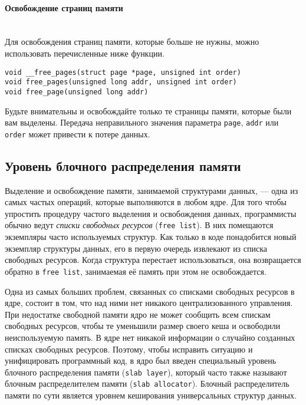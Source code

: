 \documentclass[12pt]{article}
\begin{document}
\paragraph*{Освобождение страниц памяти} ~\\
Для освобождения страниц памяти, которые больше не нужны, можно использовать
перечисленные ниже функции.

\begin{lstlisting}
void __free_pages(struct page *page, unsigned int order)
void free_pages(unsigned long addr, unsigned int order)
void free_page(unsigned long addr)
\end{lstlisting}

Будьте внимательны и освобождайте только те страницы памяти, которые были вам
выделены. Передача неправильного значения параметра \verb!page!, \verb!addr! или \verb!order! может
привести к потере данных.

\pagebreak
\subsection*{Уровень блочного распределения памяти}

Выделение и освобождение памяти, занимаемой структурами данных, — одна из самых частых операций, которые выполняются в любом ядре. Для того чтобы упростить
процедуру частого выделения и освобождения данных, программисты обычно ведут \emph{списки свободных ресурсов} (\verb!free list!). В них помещаются экземпляры
часто используемых структур. Как только в коде понадобится новый экземпляр структуры данных, его в первую очередь извлекают из списка
свободных ресурсов. Когда структура перестает использоваться, она возвращается обратно в \verb!free list!,
занимаемая её память при этом не освобождается.

Одна из самых больших проблем, связанных со списками свободных ресурсов в ядре,
состоит в том, что над ними нет никакого централизованного управления. При недостатке свободной памяти ядро не может сообщить всем спискам свободных ресурсов, чтобы
те уменьшили размер своего кеша и освободили неиспользуемую память. В ядре нет никакой информации о случайно созданных списках свободных ресурсов. Поэтому, чтобы
исправить ситуацию и унифицировать программный код, в ядро был введен специальный
уровень блочного распределения памяти (\verb!slab layer!), который часто также называют
блочным распределителем памяти (\verb!slab allocator!). Блочный распределитель памяти по
сути является уровнем кеширования универсальных структур данных.
\end{document}
